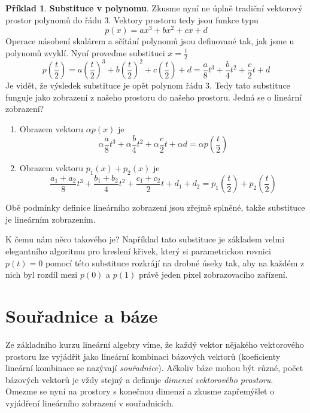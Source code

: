 \documentclass[a5paper,12pt]{amsbook}
\theoremstyle{definition}
\newtheorem{example}{Příklad}[chapter]
\begin{document}
\begin{example}\label{example:polynoms}\textbf{Substituce v polynomu}. Zkusme nyní ne úplně tradiční
vektorový prostor polynomů do řádu 3. Vektory prostoru tedy jsou funkce typu
\begin{equation*}
p(x)=ax^{3}+bx^{2}+cx+d
\end{equation*}
Operace násobení skalárem a sčítání polynomů jsou definované tak, jak jsme u polynomů zvyklí.
Nyní proveďme substituci $x=\frac{t}{2}$
\begin{equation*}
p(\frac{t}{2})=a\left(\frac{t}{2}\right)^{3}+b\left(\frac{t}{2}\right)^{2}+c\left(\frac{t}{2}\right)+d 
  = \frac{a}{8}t^{3}+\frac{b}{4}t^{2}+\frac{c}{2}t+d
\end{equation*} 
\noindent Je vidět, že výsledek substituce je opět polynom řádu 3. Tedy tato substituce funguje
jako zobrazení z našeho prostoru do našeho prostoru. Jedná se o lineární zobrazení?
\begin{enumerate}
  \item Obrazem vektoru $\alpha p(x)$ je
    \begin{equation*}
      \alpha\frac{a}{8}t^{3}+\alpha\frac{b}{4}t^{2}+\alpha\frac{c}{2}t+\alpha{}d 
      = \alpha p(\frac{t}{2})
    \end{equation*}
  \item Obrazem vektoru $p_1(x) + p_2(x)$ je
    \begin{equation*}
      \frac{a_1+a_2}{8}t^{3}+\frac{b_1+b_2}{4}t^{2}+\frac{c_1+c_2}{2}t+d_1+d_2
      = p_1(\frac{t}{2})+p_2(\frac{t}{2})
    \end{equation*}
\end{enumerate}
Obě podmínky definice lineárního zobrazení jsou zřejmě splněné, takže substituce
je lineárním zobrazením.

K čemu nám něco takového je? Například tato substituce je základem velmi elegantního algoritmu
pro kreslení křivek, který si parametrickou rovnici $p(t)=0$ pomocí této substituce rozkrájí
na drobné úseky tak, aby na každém z nich byl rozdíl mezi $p(0)$ a $p(1)$ právě jeden pixel
zobrazovacího zařízení.

\end{example}

\section{Souřadnice a báze}

\noindent Ze základního kurzu lineární algebry víme, že každý vektor nějakého vektorového prostoru lze
vyjádřit jako lineární kombinaci bázových vektorů (koeficienty lineární kombinace se nazývají
\textit{souřadnice}). Ačkoliv báze mohou být různé, počet bázových vektorů je vždy stejný
a definuje \textit{dimenzi vektorového prostoru}. Omezme se nyní na prostory s konečnou dimenzí
a zkusme zapřemýšlet o vyjádření lineárního zobrazení v souřadnicích.
\end{document}
